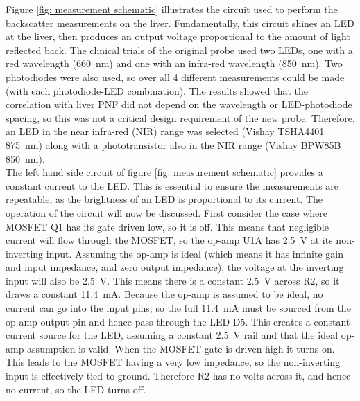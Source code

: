 Figure \ref{fig: measurement schematic} illustrates the circuit used to perform the backscatter measurements on the liver. Fundamentally, this circuit shines an LED at the liver, then produces an output voltage proportional to the amount of light reflected back. The clinical trials of the original probe \cite{Robertson} used two LEDs, one with a red wavelength (\SI{660}{\nano\metre}) and one with an infra-red wavelength (\SI{850}{\nano\metre}). Two photodiodes were also used, so over all 4 different measurements could be made (with each photodiode-LED combination). The results showed that the correlation with liver PNF did not depend on the wavelength or LED-photodiode spacing, so this was not a critical design requirement of the new probe. Therefore, an LED in the near infra-red (NIR) range was selected (Vishay TSHA4401 \cite{tsha4401} \SI{875}{\nano\metre}) along with a phototransistor also in the NIR range (Vishay BPW85B \cite{bpw85b} \SI{850}{\nano\metre}).\\

The left hand side circuit of figure \ref{fig: measurement schematic} provides a constant current to the LED. This is essential to ensure the measurements are repeatable, as the brightness of an LED is proportional to its current. The operation of the circuit will now be discussed. First consider the case where MOSFET Q1 has its gate driven low, so it is off. This means that negligible current will flow through the MOSFET, so the op-amp U1A has \SI{2.5}{\volt} at its non-inverting input. Assuming the op-amp is ideal (which means it has infinite gain and input impedance, and zero output impedance), the voltage at the inverting input will also be \SI{2.5}{\volt}. This means there is a constant \SI{2.5}{\volt} across R2, so it draws a constant \SI{11.4}{\milli\ampere}. Because the op-amp is assumed to be ideal, no current can go into the input pins, so the full \SI{11.4}{\milli\ampere} must be sourced from the op-amp output pin and hence pass through the LED D5. This creates a constant current source for the LED, assuming a constant \SI{2.5}{\volt} rail and that the ideal op-amp assumption is valid. When the MOSFET gate is driven high it turns on. This leads to the MOSFET having a very low impedance, so the non-inverting input is effectively tied to ground. Therefore R2 has no volts across it, and hence no current, so the LED turns off.\\


